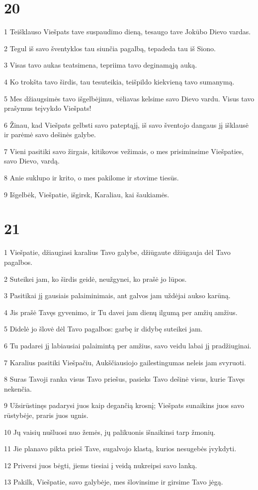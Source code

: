 \chapter{20}


\par 1 Teišklauso Viešpats tave suspaudimo dieną, tesaugo tave Jokūbo Dievo vardas. 
\par 2 Tegul iš savo šventyklos tau siunčia pagalbą, tepadeda tau iš Siono. 
\par 3 Visas tavo aukas teatsimena, tepriima tavo deginamąją auką. 
\par 4 Ko trokšta tavo širdis, tau tesuteikia, teišpildo kiekvieną tavo sumanymą. 
\par 5 Mes džiaugsimės tavo išgelbėjimu, vėliavas kelsime savo Dievo vardu. Visus tavo prašymus teįvykdo Viešpats! 
\par 6 Žinau, kad Viešpats gelbsti savo pateptąjį, iš savo šventojo dangaus jį išklausė ir parėmė savo dešinės galybe. 
\par 7 Vieni pasitiki savo žirgais, kiti­kovos vežimais, o mes prisiminsime Viešpaties, savo Dievo, vardą. 
\par 8 Anie suklupo ir krito, o mes pakilome ir stovime tiesūs. 
\par 9 Išgelbėk, Viešpatie, išgirsk, Karaliau, kai šaukiamės.



\chapter{21}


\par 1 Viešpatie, džiaugiasi karalius Tavo galybe, džiūgaute džiūgauja dėl Tavo pagalbos. 
\par 2 Suteikei jam, ko širdis geidė, neužgynei, ko prašė jo lūpos. 
\par 3 Pasitikai jį gausiais palaiminimais, ant galvos jam uždėjai aukso karūną. 
\par 4 Jis prašė Tavęs gyvenimo, ir Tu davei jam dienų ilgumą per amžių amžius. 
\par 5 Didelė jo šlovė dėl Tavo pagalbos: garbę ir didybę suteikei jam. 
\par 6 Tu padarei jį labiausiai palaimintą per amžius, savo veidu labai jį pradžiuginai. 
\par 7 Karalius pasitiki Viešpačiu, Aukščiausiojo gailestingumas neleis jam svyruoti. 
\par 8 Suras Tavoji ranka visus Tavo priešus, pasieks Tavo dešinė visus, kurie Tavęs nekenčia. 
\par 9 Užsirūstinęs padarysi juos kaip degančią krosnį; Viešpats sunaikins juos savo rūstybėje, praris juos ugnis. 
\par 10 Jų vaisių nušluosi nuo žemės, jų palikuonis išnaikinsi tarp žmonių. 
\par 11 Jie planavo pikta prieš Tave, sugalvojo klastą, kurios nesugebės įvykdyti. 
\par 12 Priversi juos bėgti, jiems tiesiai į veidą nukreipsi savo lanką. 
\par 13 Pakilk, Viešpatie, savo galybėje, mes šlovinsime ir girsime Tavo jėgą.



